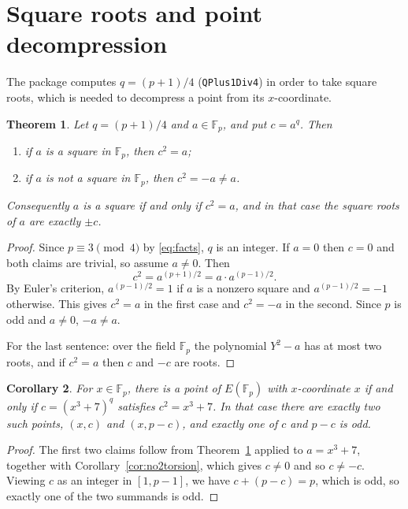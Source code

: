 \documentclass[11pt]{article}
\newtheorem{theorem}{Theorem}
\newtheorem{corollary}[theorem]{Corollary}
\theoremstyle{definition}
\theoremstyle{remark}
\newcommand{\F}{\mathbb{F}}
\begin{document}
\section{Square roots and point decompression}

The package computes $q = (p+1)/4$ (\texttt{QPlus1Div4}) in order to take square
roots, which is needed to decompress a point from its $x$-coordinate.

\begin{theorem}\label{thm:sqrt}
Let $q=(p+1)/4$ and $a\in\F_p$, and put $c = a^{q}$. Then
\begin{enumerate}
  \item if $a$ is a square in $\F_p$, then $c^2 = a$;
  \item if $a$ is not a square in $\F_p$, then $c^2 = -a \neq a$.
\end{enumerate}
Consequently $a$ is a square if and only if $c^2=a$, and in that case the
square roots of $a$ are exactly $\pm c$.
\end{theorem}

\begin{proof}
Since $p\equiv 3 \pmod 4$ by \eqref{eq:facts}, $q$ is an integer. If $a=0$ then
$c=0$ and both claims are trivial, so assume $a\neq 0$. Then
\[
  c^2 = a^{(p+1)/2} = a\cdot a^{(p-1)/2}.
\]
By Euler's criterion, $a^{(p-1)/2}=1$ if $a$ is a nonzero square and
$a^{(p-1)/2}=-1$ otherwise. This gives $c^2=a$ in the first case and $c^2=-a$
in the second. Since $p$ is odd and $a\neq0$, $-a\neq a$.

For the last sentence: over the field $\F_p$ the polynomial $Y^2-a$ has at most
two roots, and if $c^2=a$ then $c$ and $-c$ are roots.
\end{proof}

\begin{corollary}\label{cor:decompress}
For $x\in\F_p$, there is a point of $E(\F_p)$ with $x$-coordinate $x$ if and only
if $c=(x^3+7)^q$ satisfies $c^2 = x^3+7$. In that case there are exactly two such
points, $(x,c)$ and $(x,p-c)$, and exactly one of $c$ and $p-c$ is odd.
\end{corollary}

\begin{proof}
The first two claims follow from Theorem~\ref{thm:sqrt} applied to $a=x^3+7$,
together with Corollary~\ref{cor:no2torsion}, which gives $c\neq0$ and so
$c\neq -c$. Viewing $c$ as an integer in $[1,p-1]$, we have
$c + (p-c) = p$, which is odd, so exactly one of the two summands is odd.
\end{proof}
\end{document}
